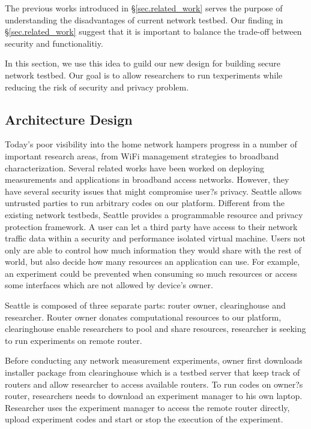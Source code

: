 \documentclass[11pt, oneside]{article}   	%
\begin{document}
The previous works introduced in \S{\ref{sec.related_work}} serves the purpose of understanding the disadvantages of current network testbed. Our finding in \S{\ref{sec.related_work}} suggest that it is important to balance the trade-off between security and functionalitiy.

In this section, we use this idea to guild our new design for building secure network testbed. Our goal is to allow researchers to run texperiments while reducing the risk of security and privacy problem.

\subsection{Architecture Design}
Today's poor visibility into the home network hampers progress in a number of important research areas, from WiFi management strategies to broadband characterization. Several related works have been worked on deploying measurements and applications in broadband access networks. However, they have several security issues that might compromise user?s privacy. Seattle allows untrusted parties to run arbitrary codes on our platform. Different from the existing network testbeds, Seattle provides a programmable resource and privacy protection framework. A user can let a third party have access to their network traffic data within a security and performance isolated virtual machine. Users not only are able to control how much information they would share with the rest of world, but also decide how many resources an application can use. For example, an experiment could be prevented when consuming so much resources or access some interfaces which are not allowed by device's owner. 

Seattle is composed of three separate parts: router owner, clearinghouse and researcher. Router owner donates computational resources to our platform, clearinghouse enable researchers to pool and share resources, researcher is seeking to run experiments on remote router.

Before conducting any network measurement experiments, owner first downloads installer package from clearinghouse which is a testbed server that keep track of routers and allow researcher to access available routers. To run codes on owner?s router, researchers needs to download an experiment manager to his own laptop. Researcher uses the experiment manager to access the remote router directly, upload experiment codes and start or stop the execution of the experiment.
\end{document}
